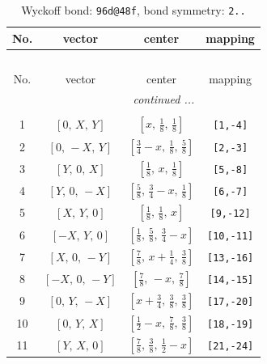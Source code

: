 \documentclass[fleqn,8pt]{jsarticle}
\begin{document}
\begin{longtable}{cccc}
\caption{Wyckoff bond: {\tt 96d@48f}, bond symmetry: {\tt 2..}}
 \\
 \hline \hline
No. & vector & center & mapping \\ \hline \endfirsthead

\multicolumn{3}{l}{\tablename\ \thetable{}} \\
 \hline \hline
No. & vector & center & mapping \\ \hline \endhead

 \hline \hline
\multicolumn{3}{r}{\footnotesize\it continued ...} \\ \endfoot

 \hline \hline
\multicolumn{3}{r}{} \\ \endlastfoot

1 & $\left[ 0,\, X,\, Y \right]$ & $\left[ x,\, \frac{1}{8},\, \frac{1}{8} \right]$ & {\tt [1,-4]} \\ \hline
2 & $\left[ 0,\, - X,\, Y \right]$ & $\left[ \frac{3}{4} - x,\, \frac{1}{8},\, \frac{5}{8} \right]$ & {\tt [2,-3]} \\ \hline
3 & $\left[ Y,\, 0,\, X \right]$ & $\left[ \frac{1}{8},\, x,\, \frac{1}{8} \right]$ & {\tt [5,-8]} \\ \hline
4 & $\left[ Y,\, 0,\, - X \right]$ & $\left[ \frac{5}{8},\, \frac{3}{4} - x,\, \frac{1}{8} \right]$ & {\tt [6,-7]} \\ \hline
5 & $\left[ X,\, Y,\, 0 \right]$ & $\left[ \frac{1}{8},\, \frac{1}{8},\, x \right]$ & {\tt [9,-12]} \\ \hline
6 & $\left[ - X,\, Y,\, 0 \right]$ & $\left[ \frac{1}{8},\, \frac{5}{8},\, \frac{3}{4} - x \right]$ & {\tt [10,-11]} \\ \hline
7 & $\left[ X,\, 0,\, - Y \right]$ & $\left[ \frac{7}{8},\, x + \frac{1}{4},\, \frac{3}{8} \right]$ & {\tt [13,-16]} \\ \hline
8 & $\left[ - X,\, 0,\, - Y \right]$ & $\left[ \frac{7}{8},\, - x,\, \frac{7}{8} \right]$ & {\tt [14,-15]} \\ \hline
9 & $\left[ 0,\, Y,\, - X \right]$ & $\left[ x + \frac{3}{4},\, \frac{3}{8},\, \frac{3}{8} \right]$ & {\tt [17,-20]} \\ \hline
10 & $\left[ 0,\, Y,\, X \right]$ & $\left[ \frac{1}{2} - x,\, \frac{7}{8},\, \frac{3}{8} \right]$ & {\tt [18,-19]} \\ \hline
11 & $\left[ Y,\, X,\, 0 \right]$ & $\left[ \frac{7}{8},\, \frac{3}{8},\, \frac{1}{2} - x \right]$ & {\tt [21,-24]} \\ \hline

\end{longtable}
\end{document}
